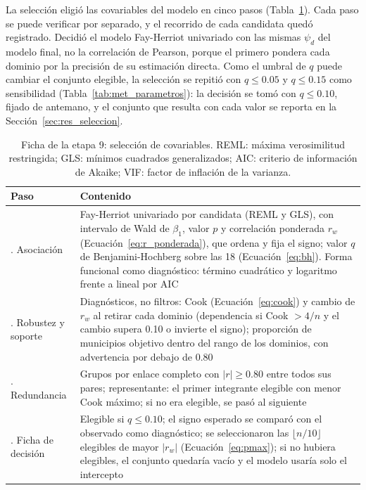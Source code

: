 La selección eligió las covariables del modelo en cinco pasos (Tabla~\ref{tab:met_seleccion}). Cada paso se puede verificar por separado, y el recorrido de cada candidata quedó registrado. Decidió el modelo Fay-Herriot univariado con las mismas $\psi_d$ del modelo final, no la correlación de Pearson, porque el primero pondera cada dominio por la precisión de su estimación directa. Como el umbral de $q$ puede cambiar el conjunto elegible, la selección se repitió con $q \leq 0.05$ y $q \leq 0.15$ como sensibilidad (Tabla~\ref{tab:met_parametros}): la decisión se tomó con $q \leq 0.10$, fijado de antemano, y el conjunto que resulta con cada valor se reporta en la Sección~\ref{sec:res_seleccion}.

\begin{table}[!htbp]
\centering
\small
\caption[Ficha de la etapa 9: selección de covariables]{Ficha de la etapa 9: selección de covariables. REML: máxima verosimilitud restringida; GLS: mínimos cuadrados generalizados; AIC: criterio de información de Akaike; VIF: factor de inflación de la varianza.}
\label{tab:met_seleccion}
\renewcommand{\arraystretch}{1.15}
\begin{tabularx}{\linewidth}{>{\raggedright\arraybackslash}p{2.8cm} >{\raggedright\arraybackslash}X}
\toprule
Paso & Contenido \\
\midrule
1. Asociación & Fay-Herriot univariado por candidata (REML y GLS), con intervalo de Wald de $\beta_1$, valor $p$ y correlación ponderada $r_w$ (Ecuación~\ref{eq:r_ponderada}), que ordena y fija el signo; valor $q$ de Benjamini-Hochberg sobre las 18 (Ecuación~\ref{eq:bh}). Forma funcional como diagnóstico: término cuadrático y logaritmo frente a lineal por AIC \\
2. Robustez y soporte & Diagnósticos, no filtros: Cook (Ecuación~\ref{eq:cook}) y cambio de $r_w$ al retirar cada dominio (dependencia si Cook $> 4/n$ y el cambio supera 0.10 o invierte el signo); proporción de municipios objetivo dentro del rango de los dominios, con advertencia por debajo de 0.80 \\
3. Redundancia & Grupos por enlace completo con $|r| \geq 0.80$ entre todos sus pares; representante: el primer integrante elegible con menor Cook máximo; si no era elegible, se pasó al siguiente \\
4. Ficha de decisión & Elegible si $q \leq 0.10$; el signo esperado se comparó con el observado como diagnóstico; se seleccionaron las $\lfloor n/10 \rfloor$ elegibles de mayor $|r_w|$ (Ecuación~\ref{eq:pmax}); si no hubiera elegibles, el conjunto quedaría vacío y el modelo usaría solo el intercepto \\

\end{tabularx}
\end{table}
